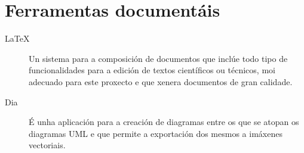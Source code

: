   \section{Ferramentas documentáis}

  \begin{description}
   \item [LaTeX] Un sistema para a composición de documentos que inclúe todo tipo de 
funcionalidades para a edición de textos científicos ou técnicos, moi adecuado para este 
proxecto e que xenera documentos de gran calidade.
   \item [Dia] É unha aplicación para a creación de diagramas entre os que se atopan os 
diagramas UML e que permite a exportación dos mesmos a imáxenes vectoriais.
  \end{description}

  
  
  